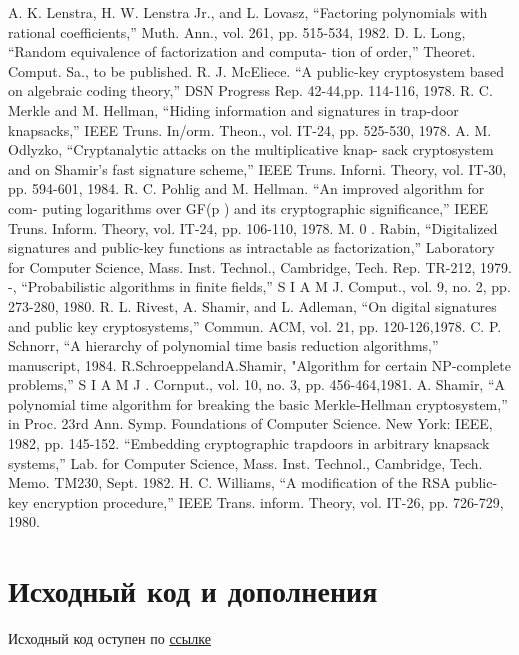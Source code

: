 \documentclass[a4paper,12pt]{article}
\begin{document}
\begin{thebibliography}{9}
A. K. Lenstra, H. W. Lenstra Jr., and L. Lovasz, “Factoring polynomials with rational coefficients,” Muth. Ann., vol. 261, pp. 515-534, 1982.
D. L. Long, “Random equivalence of factorization and computa- tion of order,” Theoret. Comput. Sa., to be published.
R. J. McEliece. “A public-key cryptosystem based on algebraic coding theory,” DSN Progress Rep. 42-44,pp. 114-116, 1978.
R. C. Merkle and M. Hellman, “Hiding information and signatures in trap-door knapsacks,” IEEE Truns. In/orm. Theon., vol. IT-24, pp. 525-530, 1978.
A. M. Odlyzko, “Cryptanalytic attacks on the multiplicative knap- sack cryptosystem and on Shamir’s fast signature scheme,” IEEE Truns. Inforni. Theory, vol. IT-30, pp. 594-601, 1984.
R. C. Pohlig and M. Hellman. “An improved algorithm for com- puting logarithms over GF(p ) and its cryptographic significance,” IEEE Truns. Inform. Theory, vol. IT-24, pp. 106-110, 1978.
M. 0 . Rabin, “Digitalized signatures and public-key functions as intractable as factorization,” Laboratory for Computer Science, Mass. Inst. Technol., Cambridge, Tech. Rep. TR-212, 1979.
-, “Probabilistic algorithms in finite fields,” S I A M J. Comput., vol. 9, no. 2, pp. 273-280, 1980.
R. L. Rivest, A. Shamir, and L. Adleman, “On digital signatures and public key cryptosystems,” Commun. ACM, vol. 21, pp. 120-126,1978.
C. P. Schnorr, “A hierarchy of polynomial time basis reduction algorithms,” manuscript, 1984.
R.SchroeppelandA.Shamir, "Algorithm for certain NP-complete problems,” S I A M J . Cornput., vol.
10, no. 3, pp. 456-464,1981.
A. Shamir, “A polynomial time algorithm for breaking the basic
Merkle-Hellman cryptosystem,” in Proc. 23rd Ann. Symp. Foundations of Computer Science. New York: IEEE, 1982, pp. 145-152.
“Embedding cryptographic trapdoors in arbitrary knapsack systems,” Lab. for Computer Science, Mass. Inst. Technol., Cambridge, Tech. Memo. TM230, Sept. 1982.
H. C. Williams, “A modification of the RSA public-key encryption procedure,” IEEE Trans. inform. Theory, vol. IT-26, pp. 726-729, 1980.
\end{thebibliography}

\newpage

\section{Исходный код и дополнения}

Исходный код оступен по \href{https://github.com/ShamrinIgor/Knapsack-Cryptosystem}{ссылке}
\newline
\end{document}
